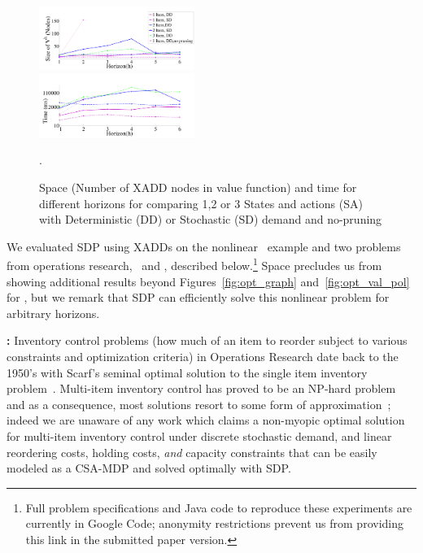 \begin{figure}[tbp!]
\includegraphics[width=0.45\textwidth]{new_pics/space1.pdf}\\
\includegraphics[width=0.45\textwidth]{new_pics/time1.pdf}
\vspace{-2mm}
\caption{\footnotesize Space (Number of XADD nodes in value function) 
and time for different horizons for \InventoryControl comparing 
1,2 or 3 States and actions (SA) with Deterministic (DD) 
or Stochastic (SD) demand and no-pruning}.
\label{fig:invC}
\end{figure}

\label{sec:results}
 
We evaluated SDP using XADDs on the nonlinear
\MarsRover\ example and two problems from operations research,
\InventoryControl\ and \WaterReservoir, described below.\footnote{
Full problem specifications and Java code to
reproduce these experiments are currently 
in Google Code; anonymity restrictions 
prevent us from providing this link in the submitted paper version.}
Space precludes us from showing 
additional results beyond Figures~\ref{fig:opt_graph}
and~\ref{fig:opt_val_pol} for
\MarsRover, but we remark that SDP can efficiently solve this
nonlinear problem for arbitrary horizons.

{\bf \InventoryControl:} Inventory control problems (how much of an
item to reorder subject to various constraints and optimization
criteria) in Operations Research date back to the 1950's with Scarf's
seminal optimal solution to the single item inventory
problem~\cite{Scarf_Karlin58}.  Multi-item inventory control has
proved to be an NP-hard problem and as a consequence, most solutions
resort to some form of approximation~\cite{needref}; indeed we are
unaware of any work which claims a non-myopic optimal solution for
multi-item inventory control under discrete stochastic demand, and
linear reordering costs, holding costs, \emph{and} capacity
constraints that can be easily modeled as a CSA-MDP and solved
optimally with SDP.


